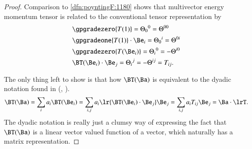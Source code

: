 \begin{proof}
Comparison to \cref{dfn:poyntingF:1180} shows that multivector energy momentum tensor is related to the conventional tensor representation by
\begin{dmath}\label{eqn:poyntingF:820}
\begin{aligned}
&\gpgradezero{ T(1) }
=
{\Theta_0}^0 = \Theta^{00} \\
&\gpgradeone{ T(1) } \cdot \Be_i
= {\Theta_0}^i = \Theta^{0i} \\
&\gpgradezero{ T(\Be_i) }
= {\Theta_i}^0 = -\Theta^{i0} \\
&\BT(\Be_i) \cdot \Be_j = {\Theta_i}^j = -\Theta^{ij} = T_{ij}.
\end{aligned}
\end{dmath}

The only thing left to show is that how \( \BT(\Ba) \) is equivalent to the dyadic notation found in
(\citep{griffiths1999introduction}, \citep{jackson1975cew}).
\begin{dmath}\label{eqn:poyntingF:1140}
\BT(\Ba)
=
\sum_i a_i \BT(\Be_i)
=
\sum_{i,j} a_i \lr{ \BT(\Be_i) \cdot \Be_j } \Be_j
=
\sum_{i,j} a_i T_{ij} \Be_j
=
\Ba \cdot \lrT.
\end{dmath}
The dyadic notation is really just a clumsy way of expressing the fact that \( \BT(\Ba) \) is a linear vector valued function of a vector, which naturally
has a matrix representation.
\end{proof}

